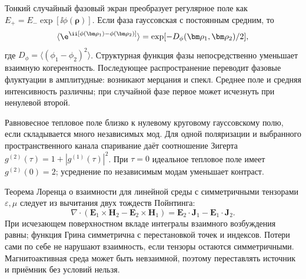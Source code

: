 
Тонкий случайный фазовый экран преобразует регулярное поле как $E_+=E_-\exp[\ii\phi(\bm\rho)]$. Если фаза гауссовская с постоянным средним, то
\begin{equation}
 \langle\e^{\ii[\phi(\bm\rho_1)-\phi(\bm\rho_2)]}\rangle
 =\exp[-D_\phi(\bm\rho_1,\bm\rho_2)/2],
\end{equation}
где $D_\phi=\langle(\phi_1-\phi_2)^2\rangle$. Структурная функция фазы непосредственно уменьшает взаимную когерентность. Последующее распространение переводит фазовые флуктуации в амплитудные: возникают мерцания и спекл. Среднее поле и средняя интенсивность различны; при случайной фазе первое может исчезнуть при ненулевой второй.

Равновесное тепловое поле близко к нулевому круговому гауссовскому полю, если складывается много независимых мод. Для одной поляризации и выбранного пространственного канала спаривание даёт соотношение Зигерта $g^{(2)}(\tau)=1+|g^{(1)}(\tau)|^2$. При $\tau=0$ идеальное тепловое поле имеет $g^{(2)}(0)=2$; усреднение по независимым модам уменьшает контраст.

Теорема Лоренца о взаимности для линейной среды с симметричными тензорами $\varepsilon,\mu$ следует из вычитания двух тождеств Пойнтинга:
\begin{equation}
 \nabla\cdot(\bm E_1\times\bm H_2-\bm E_2\times\bm H_1)
 =\bm E_2\cdot\bm J_1-\bm E_1\cdot\bm J_2.
\end{equation}
При исчезающем поверхностном вкладе интегралы взаимного возбуждения равны; функция Грина симметрична с перестановкой точек и индексов. Потери сами по себе не нарушают взаимность, если тензоры остаются симметричными. Магнитоактивная среда может быть невзаимной, поэтому переставлять источник и приёмник без условий нельзя.

